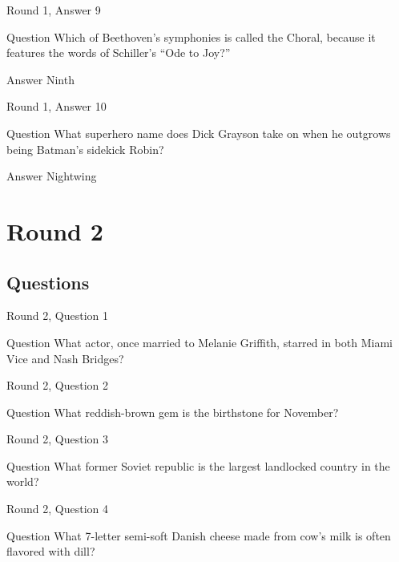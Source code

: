 \documentclass[11pt]{beamer}
\begin{document}
\begin{frame}{Round 1, Answer 9}
\begin{block}{Question}
Which of Beethoven's symphonies is called the Choral, because it features the words of Schiller's ``Ode to Joy?''
\end{block}
\pause{}
\begin{block}{Answer}
Ninth
\end{block}
\end{frame}
    

\begin{frame}{Round 1, Answer 10}
\begin{block}{Question}
What superhero name does Dick Grayson take on when he outgrows being Batman's sidekick Robin\@?
\end{block}
\pause{}
\begin{block}{Answer}
Nightwing
\end{block}
\end{frame}
    

\section{Round 2}
    
\subsection{Questions}

\begin{frame}{Round 2, Question 1}
\begin{block}{Question}
What actor, once married to Melanie Griffith, starred in both Miami Vice and Nash Bridges\@?
\end{block}
\end{frame}
    

\begin{frame}{Round 2, Question 2}
\begin{block}{Question}
What reddish-brown gem is the birthstone for November\@?
\end{block}
\end{frame}
    

\begin{frame}{Round 2, Question 3}
\begin{block}{Question}
What former Soviet republic is the largest landlocked country in the world\@?
\end{block}
\end{frame}
    

\begin{frame}{Round 2, Question 4}
\begin{block}{Question}
What 7-letter semi-soft Danish cheese made from cow's milk is often flavored with dill\@?
\end{block}
\end{frame}
    
\end{document}
